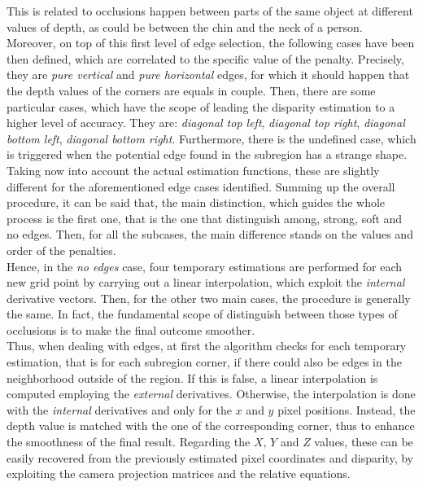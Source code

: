 This is related to occlusions happen between parts of the same object at different values of depth, as could be between the chin and the neck of a person.\\
Moreover, on top of this first level of edge selection, the following cases have been then defined, which are correlated to the specific value of the penalty.
Precisely, they are \textit{pure vertical} and \textit{pure horizontal} edges, for which it should happen that the depth values of the corners are equals in couple.
Then, there are some particular cases, which have the scope of leading the disparity estimation to a higher level of accuracy.
They are: \textit{diagonal top left}, \textit{diagonal top right}, \textit{diagonal bottom left}, \textit{diagonal bottom right}.
Furthermore, there is the undefined case, which is triggered when the potential edge found in the subregion has a strange shape.\\
Taking now into account the actual estimation functions, these are slightly different for the aforementioned edge cases identified.
Summing up the overall procedure, it can be said that, the main distinction, which guides the whole process is the first one, that is the one that distinguish among, strong, soft and no edges.
Then, for all the subcases, the main difference stands on the values and order of the penalties. \\
Hence, in the \textit{no edges} case, four temporary estimations are performed for each new grid point by carrying out a linear interpolation, which exploit the \textit{internal} derivative vectors.
Then, for the other two main cases, the procedure is generally the same. 
In fact, the fundamental scope of distinguish between those types of occlusions is to make the final outcome smoother. \\
Thus, when dealing with edges, at first the algorithm checks for each temporary estimation, that is for each subregion corner, if there could also be edges in the neighborhood outside of the region. 
If this is false, a linear interpolation is computed employing the \textit{external} derivatives.
Otherwise, the interpolation is done with the \textit{internal} derivatives and only for the $x$ and $y$ pixel positions. 
Instead, the depth value is matched with the one of the corresponding corner, thus to enhance the smoothness of the final result.
Regarding the $X$, $Y$ and $Z$ values, these can be easily recovered from the previously estimated pixel coordinates and disparity, by exploiting the camera projection matrices and the relative equations. 

